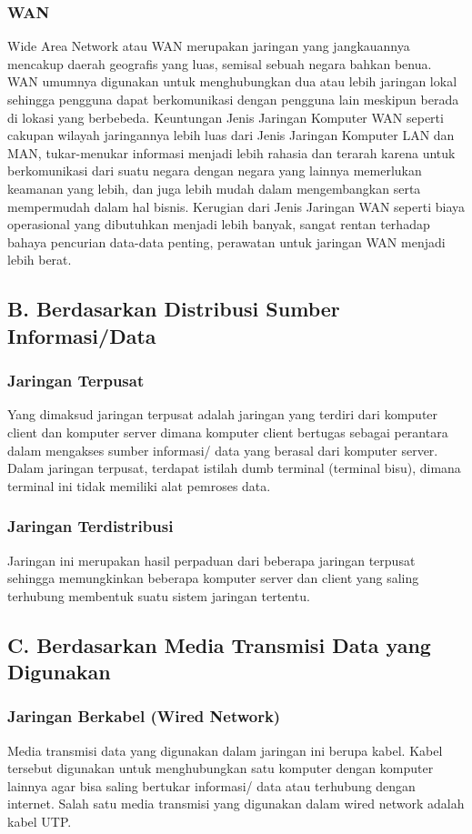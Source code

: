     \subsubsection{WAN}
      Wide Area Network atau WAN merupakan jaringan yang jangkauannya mencakup daerah geografis yang luas, semisal sebuah negara bahkan benua. WAN umumnya digunakan untuk menghubungkan dua atau lebih jaringan lokal sehingga pengguna dapat berkomunikasi dengan pengguna lain meskipun berada di lokasi yang berbebeda.
    Keuntungan Jenis Jaringan Komputer WAN seperti cakupan wilayah jaringannya lebih luas dari Jenis Jaringan Komputer LAN dan MAN, tukar-menukar informasi menjadi lebih rahasia dan terarah karena untuk berkomunikasi dari suatu negara dengan negara yang lainnya memerlukan keamanan yang lebih, dan juga lebih mudah dalam mengembangkan serta mempermudah dalam hal bisnis.
    Kerugian dari Jenis Jaringan WAN seperti biaya operasional yang dibutuhkan menjadi lebih banyak, sangat rentan terhadap bahaya pencurian data-data penting, perawatan untuk jaringan WAN menjadi lebih berat.

\subsection{B. Berdasarkan Distribusi Sumber Informasi/Data}
  \subsubsection{Jaringan Terpusat}
  Yang dimaksud jaringan terpusat adalah jaringan yang terdiri dari komputer client dan komputer server dimana komputer client bertugas sebagai perantara dalam mengakses sumber informasi/ data yang berasal dari komputer server. Dalam jaringan terpusat, terdapat istilah dumb terminal (terminal bisu), dimana terminal ini tidak memiliki alat pemroses data.
  \subsubsection{ Jaringan Terdistribusi}
  Jaringan ini merupakan hasil perpaduan dari beberapa jaringan terpusat sehingga memungkinkan beberapa komputer server dan client yang saling terhubung membentuk suatu sistem jaringan tertentu.
\subsection{C. Berdasarkan Media Transmisi Data yang Digunakan}
  \subsubsection{Jaringan Berkabel (Wired Network)}
    Media transmisi data yang digunakan dalam jaringan ini berupa kabel. Kabel tersebut digunakan untuk menghubungkan satu komputer dengan komputer lainnya agar bisa saling bertukar informasi/ data atau terhubung dengan internet. Salah satu media transmisi yang digunakan dalam wired network adalah kabel UTP.

